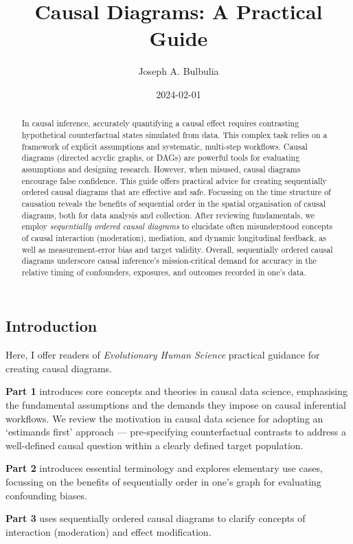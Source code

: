 \documentclass[
  singlecolumn]{article}
\title{Causal Diagrams: A Practical Guide}
\author{Joseph A. Bulbulia}
\date{2024-02-01}
\begin{document}
\maketitle
\begin{abstract}
In causal inference, accurately quantifying a causal effect requires
contrasting hypothetical counterfactual states simulated from data. This
complex task relies on a framework of explicit assumptions and
systematic, multi-step workflows. Causal diagrams (directed acyclic
graphs, or DAGs) are powerful tools for evaluating assumptions and
designing research. However, when misused, causal diagrams encourage
false confidence. This guide offers practical advice for creating
sequentially ordered causal diagrams that are effective and safe.
Focussing on the time structure of causation reveals the benefits of
sequential order in the spatial organisation of causal diagrams, both
for data analysis and collection. After reviewing fundamentals, we
employ \emph{sequentially ordered causal diagrams} to elucidate often
misunderstood concepts of causal interaction (moderation), mediation,
and dynamic longitudinal feedback, as well as measurement-error bias and
target validity. Overall, sequentially ordered causal diagrams
underscore causal inference's mission-critical demand for accuracy in
the relative timing of confounders, exposures, and outcomes recorded in
one's data.
\end{abstract}

\subsection{Introduction}\label{introduction}

Here, I offer readers of \emph{Evolutionary Human Science} practical
guidance for creating causal diagrams.

\textbf{Part 1} introduces core concepts and theories in causal data
science, emphasising the fundamental assumptions and the demands they
impose on causal inferential workflows. We review the motivation in
causal data science for adopting an `estimands first' approach ---
pre-specifying counterfactual contrasts to address a well-defined causal
question within a clearly defined target population.

\textbf{Part 2} introduces essential terminology and explores elementary
use cases, focussing on the benefits of sequentially order in one's
graph for evaluating confounding biases.

\textbf{Part 3} uses sequentially ordered causal diagrams to clarify
concepts of interaction (moderation) and effect modification.
\end{document}
